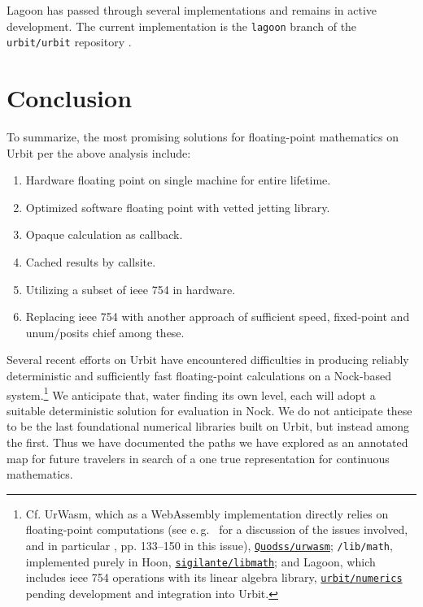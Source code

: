 \documentclass[twoside]{article}
\begin{document}
Lagoon has passed through several implementations and remains in active development.  The current implementation is the \texttt{lagoon} branch of the \texttt{urbit/urbit} repository \citep{Urbit}.


\section{Conclusion}

To summarize, the most promising solutions for floating-point mathematics on Urbit per the above analysis include:

\begin{enumerate}
  \item  Hardware floating point on single machine for entire lifetime.
  \item  Optimized software floating point with vetted jetting library.
  \item  Opaque calculation as callback.
  \item  Cached results by callsite.
  \item  Utilizing a subset of {\sc ieee} 754 in hardware.
  \item  Replacing {\sc ieee} 754 with another approach of sufficient speed, fixed-point and unum/posits chief among these.
\end{enumerate}

Several recent efforts on Urbit have encountered difficulties in producing reliably deterministic and sufficiently fast floating-point calculations on a Nock-based system.\footnote{Cf. UrWasm, which as a WebAssembly implementation directly relies on floating-point computations \citep{UrWasm} (see e.\,g.\ \citet{KloudKoder2022} for a discussion of the issues involved, and in particular \citeauthor{Afonin2024}, pp. 133–150 in this issue), \href{https://github.com/Quodss/urwasm}{\texttt{Quodss/urwasm}}; \texttt{/lib/math}, implemented purely in Hoon, \href{https://github.com/sigilante/libmath}{\texttt{sigilante/libmath}}; and Lagoon, which includes {\sc ieee} 754 operations with its linear algebra library, \href{https://github.com/urbit/numerics}{\texttt{urbit/numerics}} pending development and integration into Urbit.}  We anticipate that, water finding its own level, each will adopt a suitable deterministic solution for evaluation in Nock.  We do not anticipate these to be the last foundational numerical libraries built on Urbit, but instead among the first.  Thus we have documented the paths we have explored as an annotated map for future travelers in search of a one true representation for continuous mathematics. \tombstone{}

\printbibliography
\end{document}
